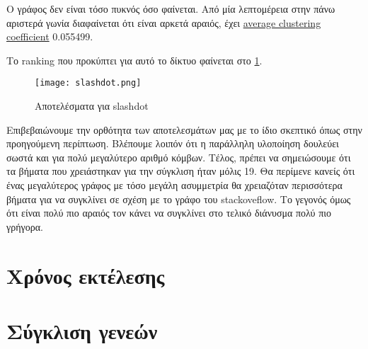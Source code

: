 Ο γράφος δεν είναι τόσο πυκνός όσο φαίνεται.
Από μία λεπτομέρεια στην πάνω αριστερά γωνία διαφαίνεται ότι είναι αρκετά αραιός,
έχει
\href{https://en.wikipedia.org/wiki/Clustering_coefficient#Global_clustering_coefficient}{average clustering coefficient} 0.055499.

Το ranking που προκύπτει για αυτό το δίκτυο φαίνεται στο
\hyperref[fig:slackres]{\figurename{} \ref{fig:slackres}}.
\begin{figure}[h!t]
	\centering
	\texttt{[image: slashdot.png]}
	\caption{Αποτελέσματα για slashdot}
	\label{fig:slackres}
\end{figure}
Επιβεβαιώνουμε την ορθότητα των αποτελεσμάτων μας με το ίδιο σκεπτικό όπως στην προηγούμενη περίπτωση.
Βλέπουμε λοιπόν ότι η παράλληλη υλοποίηση δουλεύει σωστά και για πολύ μεγαλύτερο αριθμό κόμβων.
Τέλος, πρέπει να σημειώσουμε ότι τα βήματα που χρειάστηκαν για την σύγκλιση ήταν μόλις 19.
Θα περίμενε κανείς ότι ένας μεγαλύτερος γράφος με τόσο μεγάλη ασυμμετρία θα χρειαζόταν περισσότερα βήματα για να συγκλίνει σε σχέση με το γράφο του stackoveflow.
Το γεγονός όμως ότι είναι πολύ πιο αραιός τον κάνει να συγκλίνει στο τελικό διάνυσμα πολύ πιο γρήγορα.
\clearpage
\section{Χρόνος εκτέλεσης}
\clearpage
\section{Σύγκλιση γενεών}